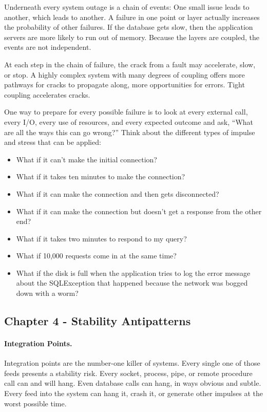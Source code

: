 Underneath every system outage is a chain of events: One small issue leads to another, which leads to another. A failure in one point or layer actually increases the probability of other failures. If the database gets slow, then the application servers are more likely to run out of memory. Because the layers are coupled, the events are not independent.

At each step in the chain of failure, the crack from a fault may accelerate, slow, or stop. A highly complex system with many degrees of coupling offers more pathways for cracks to propagate along, more opportunities for errors. Tight coupling accelerates cracks.


One way to prepare for every possible failure is to look at every external call, every I/O, every use of resources, and every expected outcome and ask, “What are all the ways this can go wrong?” Think about the different types of impulse and stress that can be applied:

\begin{itemize}
\item What if it can’t make the initial connection?
\item What if it takes ten minutes to make the connection?
\item What if it can make the connection and then gets disconnected?
\item What if it can make the connection but doesn’t get a response from the other end?
\item What if it takes two minutes to respond to my query?
\item What if 10,000 requests come in at the same time?
\item What if the disk is full when the application tries to log the error message about the SQLException that happened because the network was bogged down with a worm?
\end{itemize}

\subsection{Chapter 4 - Stability Antipatterns}

\paragraph{Integration Points.} Integration points are the number-one killer of systems. Every single one of those feeds presents a stability risk. Every socket, process, pipe, or remote procedure call can and will hang. Even database calls can hang, in ways obvious and subtle. Every feed into the system can hang it, crash it, or generate other impulses at the worst possible time.

